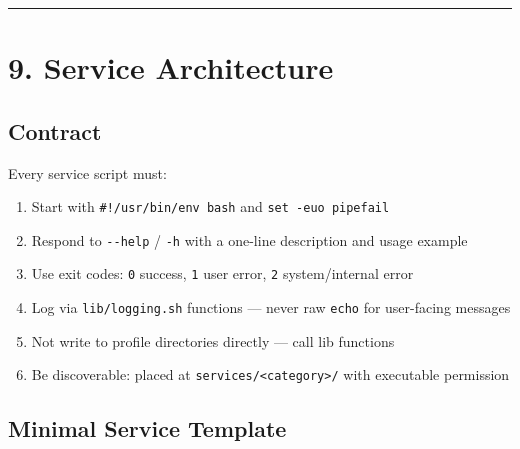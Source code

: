\documentclass[
]{article}
\providecommand{\tightlist}{%
  \setlength{\itemsep}{0pt}\setlength{\parskip}{0pt}}
\begin{document}
\begin{center}\rule{0.5\linewidth}{0.5pt}\end{center}

\section{9. Service Architecture}\label{service-architecture}

\subsection{Contract}\label{contract}

Every service script must:

\begin{enumerate}
\def\labelenumi{\arabic{enumi}.}
\tightlist
\item
  Start with \texttt{\#!/usr/bin/env\ bash} and
  \texttt{set\ -euo\ pipefail}
\item
  Respond to \texttt{-\/-help} / \texttt{-h} with a one-line description
  and usage example
\item
  Use exit codes: \texttt{0} success, \texttt{1} user error, \texttt{2}
  system/internal error
\item
  Log via \texttt{lib/logging.sh} functions --- never raw \texttt{echo}
  for user-facing messages
\item
  Not write to profile directories directly --- call lib functions
\item
  Be discoverable: placed at
  \texttt{services/\textless{}category\textgreater{}/} with executable
  permission
\end{enumerate}

\subsection{Minimal Service Template}\label{minimal-service-template}
\end{document}
